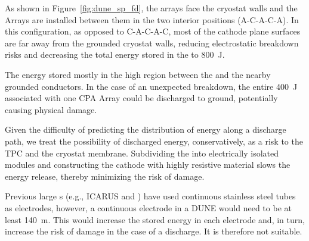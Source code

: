 As shown in Figure~\ref{fig:dune_sp_fd}, the  arrays face the cryostat walls and the  Arrays are installed between them in the two interior positions (A-C-A-C-A).
In this configuration, as opposed to C-A-C-A-C,  most of the cathode plane surfaces are far away from the grounded cryostat walls, reducing electrostatic breakdown risks and decreasing the total energy stored in the \efield to \SI{800}{J}.

The energy stored mostly in the high \efield{} region between the  and the nearby grounded conductors.  In the case of an unexpected  breakdown, the entire \SI{400}{J} associated with one CPA Array could be
discharged to ground,
potentially causing physical damage.


Given the difficulty of predicting the distribution of energy along a discharge path, we treat the possibility of discharged energy, conservatively, as a risk to the TPC and the cryostat membrane. 
Subdividing the  into electrically isolated modules and constructing the cathode with highly resistive material slows the energy release, thereby minimizing the risk of damage.

Previous large \lartpc{}s (e.g., ICARUS and \microboone) have used continuous stainless steel tubes as electrodes,
however, a continuous electrode in a DUNE  would need to be at least \SI{140}{\m}. This would increase the stored energy in each electrode and, in turn, increase the risk of damage in the case of a discharge. It is therefore not suitable.

